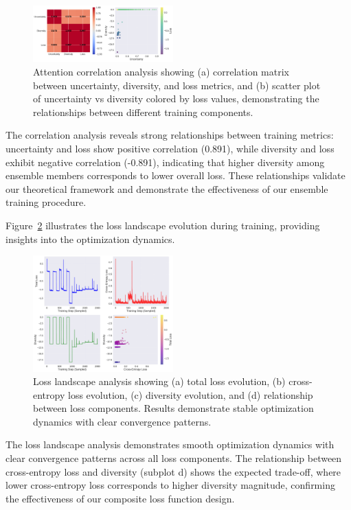 \documentclass[journal]{IEEEtran}
\begin{document}
\begin{figure}[t]
\centering
\includegraphics[width=0.48\textwidth]{figures/attention_correlation.pdf}
\caption{Attention correlation analysis showing (a) correlation matrix between uncertainty, diversity, and loss metrics, and (b) scatter plot of uncertainty vs diversity colored by loss values, demonstrating the relationships between different training components.}
\label{fig:attention_correlation}
\end{figure}

The correlation analysis reveals strong relationships between training metrics: uncertainty and loss show positive correlation (0.891), while diversity and loss exhibit negative correlation (-0.891), indicating that higher diversity among ensemble members corresponds to lower overall loss. These relationships validate our theoretical framework and demonstrate the effectiveness of our ensemble training procedure.

Figure~\ref{fig:loss_landscape} illustrates the loss landscape evolution during training, providing insights into the optimization dynamics.

\begin{figure}[t]
\centering
\includegraphics[width=0.48\textwidth]{figures/loss_landscape.pdf}
\caption{Loss landscape analysis showing (a) total loss evolution, (b) cross-entropy loss evolution, (c) diversity evolution, and (d) relationship between loss components. Results demonstrate stable optimization dynamics with clear convergence patterns.}
\label{fig:loss_landscape}
\end{figure}

The loss landscape analysis demonstrates smooth optimization dynamics with clear convergence patterns across all loss components. The relationship between cross-entropy loss and diversity (subplot d) shows the expected trade-off, where lower cross-entropy loss corresponds to higher diversity magnitude, confirming the effectiveness of our composite loss function design.
\end{document}
